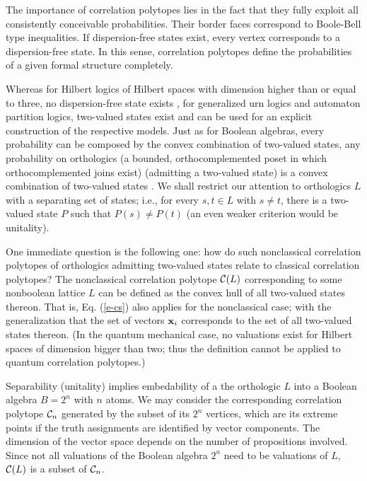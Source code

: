 The importance of correlation polytopes lies in the fact that they fully exploit
all consistently conceivable probabilities. Their border faces correspond to Boole-Bell type
inequalities. If dispersion-free states exist, every vertex corresponds to a dispersion-free state.
In this sense, correlation polytopes define the probabilities of a given formal structure
completely.

Whereas for Hilbert logics  of Hilbert spaces
with dimension higher than or equal to three,
no dispersion-free state exists \cite{kochen1},
for generalized urn logics and automaton partition logics,
two-valued states exist and can be used for an explicit construction of the respective models.
Just as for Boolean algebras,  every probability can be composed by
the convex combination of two-valued states,
any probability on orthologics
(a bounded, orthocomplemented poset in which orthocomplemented joins exist)
(admitting a two-valued state)
is a convex combination of two-valued states
\cite[Theorems 1.6, 1.7]{wright:pent}.
We shall restrict our attention to orthologics $L$ with a separating set of states; i.e.,
for every $s,t\in L$ with $s\neq t$, there is a two-valued state $P$ such that $P(s)\neq P(t)$
(an even weaker criterion would be unitality).


One immediate question is the following one:
how do such nonclassical correlation polytopes
of orthologics admitting two-valued states relate to classical correlation polytopes?
The nonclassical correlation polytope ${\cal C}(L)$ corresponding to
some nonboolean lattice $L$ can be defined as the convex hull
of all two-valued states thereon.
That is, Eq. (\ref{e-cs}) also applies for the nonclassical case; with
the generalization that the set of vectors ${\bf x}_i$ corresponds to the set of all
two-valued states thereon.
(In the  quantum mechanical case, no valuations exist for Hilbert spaces of dimension bigger than two;
thus the definition cannot be applied to quantum correlation polytopes.)

Separability (unitality) implies embedability of a the orthologic $L$ into
a Boolean algebra $B=2^n$ with  $n$ atoms.
We may consider the corresponding correlation polytope  ${\cal C}_n$ generated by
the subset of its $2^n$ vertices, which are its extreme points if the truth
assignments are identified by vector components.
The dimension of the vector space depends on the number of propositions involved.
Since not all valuations of the Boolean algebra $2^n$
need to be valuations of $L$, ${\cal C}(L)$ is  a subset of  ${\cal C}_n$.


